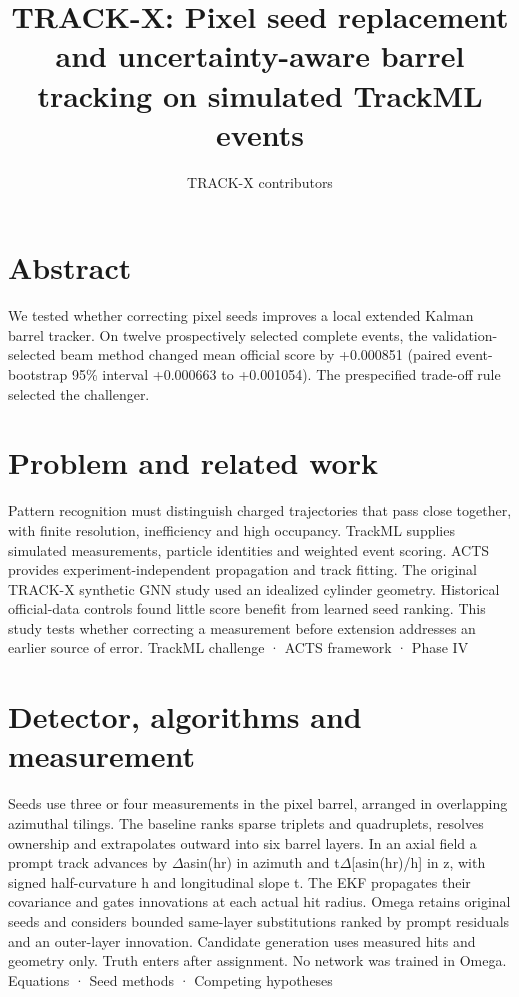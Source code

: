 \documentclass[10pt]{article}
\begin{document}
\title{TRACK-X: Pixel seed replacement and uncertainty-aware barrel tracking on simulated TrackML events}
\author{TRACK-X contributors}
\date{}\maketitle
\section*{Abstract}
We tested whether correcting pixel seeds improves a local extended Kalman barrel tracker. On twelve prospectively selected complete events, the validation-selected beam method changed mean official score by +0.000851 (paired event-bootstrap 95\% interval +0.000663 to +0.001054). The prespecified trade-off rule selected the challenger.\par
\section*{Problem and related work}
Pattern recognition must distinguish charged trajectories that pass close together, with finite resolution, inefficiency and high occupancy. TrackML supplies simulated measurements, particle identities and weighted event scoring. ACTS provides experiment-independent propagation and track fitting. The original TRACK-X synthetic GNN study used an idealized cylinder geometry. Historical official-data controls found little score benefit from learned seed ranking. This study tests whether correcting a measurement before extension addresses an earlier source of error. TrackML challenge · ACTS framework · Phase IV\par
\section*{Detector, algorithms and measurement}
Seeds use three or four measurements in the pixel barrel, arranged in overlapping azimuthal tilings. The baseline ranks sparse triplets and quadruplets, resolves ownership and extrapolates outward into six barrel layers. In an axial field a prompt track advances by $\Delta$asin(hr) in azimuth and t$\Delta$[asin(hr)/h] in z, with signed half-curvature h and longitudinal slope t. The EKF propagates their covariance and gates innovations at each actual hit radius. Omega retains original seeds and considers bounded same-layer substitutions ranked by prompt residuals and an outer-layer innovation. Candidate generation uses measured hits and geometry only. Truth enters after assignment. No network was trained in Omega. Equations · Seed methods · Competing hypotheses\par
\end{document}
